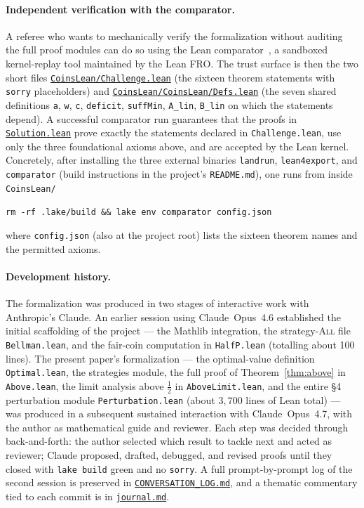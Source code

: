 \documentclass[12pt]{article}
\theoremstyle{definition}
\theoremstyle{remark}
\newcommand{\All}{\textsc{All}}
\begin{document}
\paragraph{Independent verification with the comparator.}
A referee who wants to mechanically verify the formalization
without auditing the full proof modules can do so using the Lean
comparator~\cite{LeanComparator}, a sandboxed kernel-replay tool
maintained by the Lean FRO.  The trust surface is then the two
short files
\href{https://github.com/pfaffelh/coins/blob/main/CoinsLean/Challenge.lean}{\texttt{CoinsLean/Challenge.lean}}
(the sixteen theorem statements with \texttt{sorry} placeholders)
and
\href{https://github.com/pfaffelh/coins/blob/main/CoinsLean/CoinsLean/Defs.lean}{\texttt{CoinsLean/CoinsLean/Defs.lean}}
(the seven shared definitions \texttt{a}, \texttt{w}, \texttt{c},
\texttt{deficit}, \texttt{suffMin}, \texttt{A\_lin}, \texttt{B\_lin}
on which the statements depend).  A successful comparator run
guarantees that the proofs in
\href{https://github.com/pfaffelh/coins/blob/main/CoinsLean/Solution.lean}{\texttt{Solution.lean}}
prove exactly the statements declared in \texttt{Challenge.lean},
use only the three foundational axioms above, and are accepted by
the Lean kernel.  Concretely, after installing the three external
binaries \texttt{landrun}, \texttt{lean4export}, and
\texttt{comparator} (build instructions in the project's
\texttt{README.md}), one runs from inside \texttt{CoinsLean/}
\begin{center}
  \texttt{rm -rf .lake/build \&\& lake env comparator config.json}
\end{center}
where \texttt{config.json} (also at the project root) lists the
sixteen theorem names and the permitted axioms.

\paragraph{Development history.}
The formalization was produced in two stages of interactive work
with Anthropic's Claude.  An earlier session using Claude~Opus~4.6
established the initial scaffolding of the project --- the
Mathlib integration, the strategy-\All{} file
\texttt{Bellman.lean}, and the fair-coin computation in
\texttt{HalfP.lean} (totalling about 100 lines).  The present
paper's formalization --- the optimal-value definition
\texttt{Optimal.lean}, the strategies module, the full proof of
Theorem~\ref{thm:above} in \texttt{Above.lean}, the limit
analysis above $\tfrac12$ in \texttt{AboveLimit.lean}, and the
entire \S4 perturbation module \texttt{Perturbation.lean} (about
$3{,}700$ lines of Lean total) --- was produced in a subsequent
sustained interaction with Claude~Opus~4.7, with the author as
mathematical guide and reviewer.  Each step was decided through
back-and-forth: the author selected which result to tackle next
and acted as reviewer; Claude proposed, drafted, debugged, and
revised proofs until they closed with \texttt{lake build} green and
no \texttt{sorry}.  A full prompt-by-prompt log of the second
session is preserved in
\href{https://github.com/pfaffelh/coins/blob/main/CONVERSATION_LOG.md}{\texttt{CONVERSATION\_LOG.md}},
and a thematic commentary tied to each commit is in
\href{https://github.com/pfaffelh/coins/blob/main/journal.md}{\texttt{journal.md}}.
\end{document}
